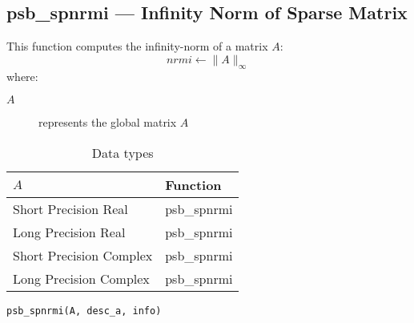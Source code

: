 %
%


\clearpage\subsection*{psb\_spnrmi --- Infinity Norm of Sparse Matrix}    

This function computes the infinity-norm of a matrix $A$:\\

\[ nrmi \leftarrow \|A\|_\infty \]
where:
\begin{description}
\item[$A$] represents the global matrix $A$
\end{description}

\begin{table}[h]
\begin{center}
\begin{tabular}{ll}
\hline
$A$ & {\bf Function}\\
\hline
Short Precision Real & psb\_spnrmi \\
Long Precision Real & psb\_spnrmi \\
Short Precision Complex & psb\_spnrmi \\
Long Precision Complex & psb\_spnrmi \\
\hline
\end{tabular}
\end{center}
\caption{Data types\label{tab:f90nrmi}}
\end{table}

\begin{verbatim}
psb_spnrmi(A, desc_a, info)
\end{verbatim}

